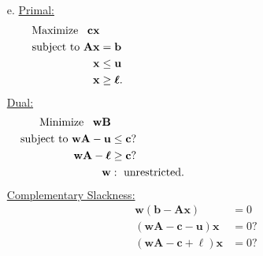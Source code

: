 \documentclass[12pt]{amsart}
\begin{document}
\begin{enumerate}
	\item[e.]
	\underline{Primal:}
	\begin{align*}
		\text{Maximize }\,\ \mathbf{cx} & \hspace{55ex}\\
		\text{subject to  } \mathbf{Ax} &= \mathbf{b} \\
		\mathbf{x} &\leq \mathbf{u} \\
		\mathbf{x} &\geq \boldsymbol{\ell}.
	\end{align*}
	\underline{Dual:}
	\begin{align*}
		\text{Minimize }\,\ \mathbf{wB} & \hspace{55ex}\\
		\text{subject to  } 
		\mathbf{wA}- \mathbf{u} &\leq \mathbf{c} ?\\
		\mathbf{wA}- \boldsymbol{\ell} &\geq \mathbf{c} ?\\
		\mathbf{w} &:\text{ unrestricted}.
	\end{align*}
	\underline{Complementary Slackness:}
	\begin{align*}
		\mathbf{w}(\mathbf{b}-\mathbf{Ax}) &=0 \\
		(\mathbf{wA}-\mathbf{c}-\mathbf{u})\mathbf{x} &=0 ? \\
		(\mathbf{wA}-\mathbf{c}+\boldsymbol{\ell})\mathbf{x} &=0 ?
	\end{align*}
	
\end{enumerate}
\end{document}
